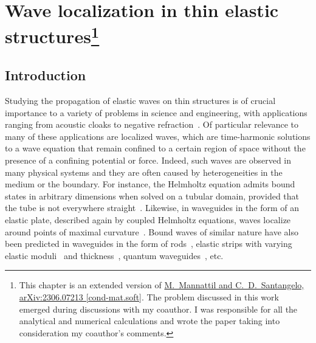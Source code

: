 
\chapter[Wave localization in thin elastic structures]{Wave localization in thin elastic structures\footnote{
  This chapter is an extended version of \href{https:/arxiv.org/abs/2306.07213}{M.~Mannattil and C.~D.~Santangelo, arXiv:2306.07213 [cond-mat.soft]}.
  The problem discussed in this work emerged during discussions with my coauthor.
  I was responsible for all the analytical and numerical calculations and wrote the paper taking into consideration my coauthor's comments.
}}
\label{chap05}


\section{Introduction}
\label{sec:introduction}

Studying the propagation of elastic waves on thin structures is of crucial importance to a variety of problems in science and engineering, with applications ranging from acoustic cloaks to negative refraction~\cite{farhat2009,craster2012,zangeneh-nejad2019}.
Of particular relevance to many of these applications are localized waves, which are time-harmonic solutions to a wave equation that remain confined to a certain region of space without the presence of a confining potential or force.
Indeed, such waves are observed in many physical systems and they are often caused by heterogeneities in the medium or the boundary.
For instance, the Helmholtz equation admits bound states in arbitrary dimensions when solved on a tubular domain, provided that the tube is not everywhere straight~\cite{goldstone1992}.
Likewise, in waveguides in the form of an elastic plate, described again by coupled Helmholtz equations, waves localize around points of maximal curvature~\cite{gridin2005}.
Bound waves of similar nature have also been predicted in waveguides in the form of rods~\cite{gridin2005a}, elastic strips with varying elastic moduli~\cite{forster2006} and thickness~\cite{postnova2008}, quantum waveguides~\cite{duclos1995}, etc.

